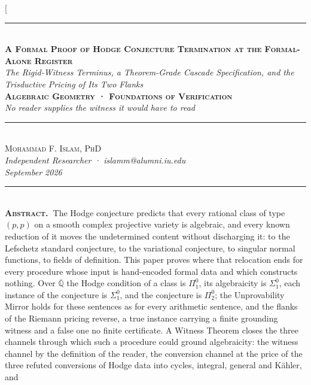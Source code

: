 \documentclass[10pt,twocolumn]{article}
\begin{document}
\twocolumn[{%
\begin{center}
{\color{accent}\rule{0.6\textwidth}{0.8pt}}\\[10pt]
{\bfseries\scshape\fontsize{20}{23}\selectfont A Formal Proof of Hodge
Conjecture Termination at the Formal-Alone Register}\\[7pt]
{\itshape\large The Rigid-Witness Terminus, a Theorem-Grade Cascade
Specification, and the Trisductive Pricing of Its Two Flanks}\\[8pt]
{\footnotesize\color{accent}\scshape\bfseries Algebraic Geometry ·
Foundations of Verification}\\[3pt]
{\itshape\color{deep}\small No reader supplies the witness it would have
to read}\\[9pt]
{\color{accent}\rule{0.6\textwidth}{0.8pt}}\\[10pt]
{\scshape Mohammad F. Islam, PhD}\\[2pt]
{\itshape\color{faint}\small Independent Researcher ·
islamm@alumni.iu.edu}\\[2pt]
{\itshape\color{faint}\small September 2026}\\[14pt]
\end{center}
\begin{minipage}{\textwidth}
{\color{accent}\rule{\textwidth}{0.6pt}}\\[4pt]
{\small\hspace{1em}\textbf{\scshape\color{deep}Abstract.\ }The Hodge
conjecture predicts that every rational class of type \((p,p)\) on a
smooth complex projective variety is algebraic, and every known
reduction of it moves the undetermined content without discharging it:
to the Lefschetz standard conjecture, to the variational conjecture, to
singular normal functions, to fields of definition. This paper proves
where that relocation ends for every procedure whose input is
hand-encoded formal data and which constructs nothing. Over
\(\overline{\mathbb{Q}}\) the Hodge condition of a class is \(\Pi^0_1\),
its algebraicity is \(\Sigma^0_1\), each instance of the conjecture is
\(\Sigma^0_1\), and the conjecture is \(\Pi^0_2\); the Unprovability
Mirror holds for these sentences as for every arithmetic sentence, and
the flanks of the Riemann pricing reverse, a true instance carrying a
finite grounding witness and a false one no finite certificate. A
Witness Theorem closes the three channels through which such a procedure
could ground algebraicity: the witness channel by the definition of the
reader, the conversion channel at the price of the three refuted
conversions of Hodge data into cycles, integral, general and Kähler, and
}
\end{minipage}}
\end{document}
